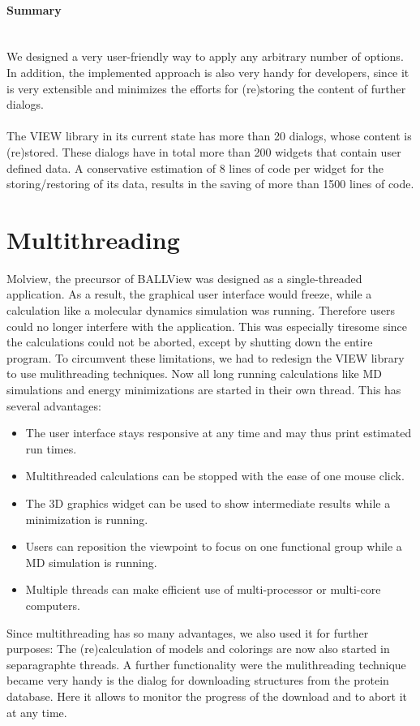 \paragraph{Summary}
\hspace*{\fill}\\
We designed a very user-friendly way to apply any arbitrary number of options. 
In addition, the implemented approach is also very handy for developers, since it
is very extensible and minimizes the efforts for (re)storing the content of further dialogs. 
\\
\\
The VIEW library in its current state has more than 20 dialogs, whose content is (re)stored. 
These dialogs have in total more than 200 widgets that contain user defined data.
A conservative estimation of 8 lines of code per widget for the storing/restoring of its data, results in 
the saving of more than 1500 lines of code.
\section{Multithreading}\label{mthread}
Molview, the precursor of BALLView was designed as a single-threaded application. 
As a result, the graphical user interface would freeze, while a calculation like a 
molecular dynamics simulation was running.
Therefore users could no longer interfere with the application.
This was especially tiresome since the calculations could not be aborted, except by 
shutting down the entire program.
To circumvent these limitations, we had to redesign the VIEW library to use mulithreading 
techniques.
Now all long running calculations like MD simulations and energy minimizations are 
started in their own thread.
This has several advantages:
\begin{itemize}
  \item The user interface stays responsive at any time and may thus \eg print
        estimated run times.
  \item Multithreaded calculations can be stopped with the ease of one mouse
        click.
  \item The 3D graphics widget can be used to show intermediate results \eg 
        while a minimization is running.
  \item Users can reposition the viewpoint \eg to focus on one functional group
        while a MD simulation is running.
  \item Multiple threads can make efficient use of multi-processor or multi-core
        computers.
\end{itemize}
Since multithreading has so many advantages, we also used it for further purposes:
The (re)calculation of models and colorings are now also started in separagraphte threads.
A further functionality were the mulithreading technique became very handy is the dialog for 
downloading structures from the protein database. 
Here it allows to monitor the progress of the download and to abort it at any time.

